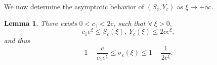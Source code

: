 \documentclass[12pt]{article}
\newtheorem{lemma}[theorem]{Lemma}
\theoremstyle{definition}
\theoremstyle{remark}
\numberwithin{equation}{section}
\begin{document}




We now determine the asymptotic behavior of $ (S_c, Y_c) $ as \(\xi\to+\infty\). 
\begin{lemma}
    \label{lm:asymptotic-S-Y-cnt} There exists $ 0 < c_1 < 2c $, such that $ \forall \ \xi > 0 $, 
    \begin{equation}
        \label{cnt-tw-022}
        c_1 e^\xi  \leq S_c (\xi),\ Y_c(\xi) \leq 2c e^\xi,
    \end{equation}
    and thus
    \begin{equation}
        \label{cnt-tw-023}
        1-\frac{c}{c_1 e^\xi}\leq \sigma_c(\xi) \leq 1- \frac{1}{2 e^\xi}.
    \end{equation}
\end{lemma}
\end{document}
